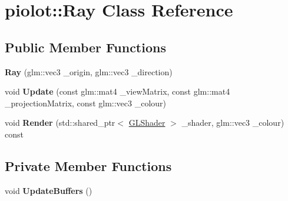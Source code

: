 \hypertarget{classpiolot_1_1_ray}{}\section{piolot\+:\+:Ray Class Reference}
\label{classpiolot_1_1_ray}
\subsection*{Public Member Functions}
\begin{DoxyCompactItemize}
\item 
\mbox{\label{classpiolot_1_1_ray_a800439dfd7597c519c4e6d5b6336a655}} 
{\bfseries Ray} (glm\+::vec3 \+\_\+origin, glm\+::vec3 \+\_\+direction)
\item 
\mbox{\label{classpiolot_1_1_ray_ada7c74126da4e4c8c0c7a63ae36c1ced}} 
void {\bfseries Update} (const glm\+::mat4 \+\_\+view\+Matrix, const glm\+::mat4 \+\_\+projection\+Matrix, const glm\+::vec3 \+\_\+colour)
\item 
\mbox{\label{classpiolot_1_1_ray_a7ecae233c62860e006b474b293c1e6ca}} 
void {\bfseries Render} (std\+::shared\+\_\+ptr$<$ \mbox{\hyperlink{classpiolot_1_1_g_l_shader}{G\+L\+Shader}} $>$ \+\_\+shader, glm\+::vec3 \+\_\+colour) const
\end{DoxyCompactItemize}
\subsection*{Private Member Functions}
\begin{DoxyCompactItemize}
\item 
\mbox{\label{classpiolot_1_1_ray_a6c21a81fd81741cca7f823e87fed1aef}} 
void {\bfseries Update\+Buffers} ()
\end{DoxyCompactItemize}
